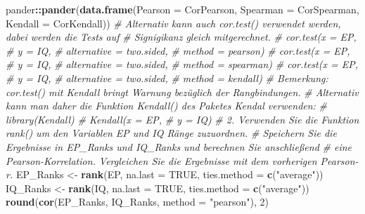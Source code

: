 \documentclass[
]{article}
\newenvironment{Shaded}{\begin{snugshade}}{\end{snugshade}}
\newcommand{\AttributeTok}[1]{\textcolor[rgb]{0.13,0.29,0.53}{#1}}
\newcommand{\CommentTok}[1]{\textcolor[rgb]{0.56,0.35,0.01}{\textit{#1}}}
\newcommand{\ConstantTok}[1]{\textcolor[rgb]{0.56,0.35,0.01}{#1}}
\newcommand{\DecValTok}[1]{\textcolor[rgb]{0.00,0.00,0.81}{#1}}
\newcommand{\FunctionTok}[1]{\textcolor[rgb]{0.13,0.29,0.53}{\textbf{#1}}}
\newcommand{\NormalTok}[1]{#1}
\newcommand{\OtherTok}[1]{\textcolor[rgb]{0.56,0.35,0.01}{#1}}
\newcommand{\SpecialCharTok}[1]{\textcolor[rgb]{0.81,0.36,0.00}{\textbf{#1}}}
\newcommand{\StringTok}[1]{\textcolor[rgb]{0.31,0.60,0.02}{#1}}
\begin{document}
\begin{Shaded}
\begin{Highlighting}[]
\NormalTok{    pander}\SpecialCharTok{::}\FunctionTok{pander}\NormalTok{(}\FunctionTok{data.frame}\NormalTok{(}\AttributeTok{Pearson  =}\NormalTok{ CorPearson,}
                      \AttributeTok{Spearman =}\NormalTok{ CorSpearman,}
                      \AttributeTok{Kendall  =}\NormalTok{ CorKendall))}
    \CommentTok{\# Alternativ kann auch cor.test() verwendet werden, dabei werden die Tests auf}
    \CommentTok{\# Signigikanz gleich mitgerechnet.}
    \CommentTok{\# cor.test(x = EP, }
    \CommentTok{\#          y = IQ, }
    \CommentTok{\#          alternative = \textquotesingle{}two.sided\textquotesingle{}, }
    \CommentTok{\#          method = \textquotesingle{}pearson\textquotesingle{})    }
    \CommentTok{\# cor.test(x = EP, }
    \CommentTok{\#          y = IQ, }
    \CommentTok{\#          alternative = \textquotesingle{}two.sided\textquotesingle{}, }
    \CommentTok{\#          method = \textquotesingle{}spearman\textquotesingle{})    }
    \CommentTok{\# cor.test(x = EP, }
    \CommentTok{\#          y = IQ, }
    \CommentTok{\#          alternative = \textquotesingle{}two.sided\textquotesingle{}, }
    \CommentTok{\#          method = \textquotesingle{}kendall\textquotesingle{})    }
    \CommentTok{\# Bemerkung: cor.test() mit Kendall bringt Warnung bezüglich der Rangbindungen.}
    \CommentTok{\#            Alternativ kann man daher die Funktion Kendall() des Paketes Kendal verwenden:}
      \CommentTok{\# library(Kendall)}
        \CommentTok{\# Kendall(x = EP, }
        \CommentTok{\#         y = IQ)}
    \CommentTok{\# 2. Verwenden Sie die Funktion rank() um den Variablen EP und IQ Ränge zuzuordnen.}
    \CommentTok{\#   Speichern Sie die Ergebnisse in EP\_Ranks und IQ\_Ranks und berechnen Sie anschließend}
    \CommentTok{\#   eine Pearson{-}Korrelation. Vergleichen Sie die Ergebnisse mit dem vorherigen Pearson{-}r.}
\NormalTok{    EP\_Ranks }\OtherTok{\textless{}{-}} \FunctionTok{rank}\NormalTok{(EP, }\AttributeTok{na.last =} \ConstantTok{TRUE}\NormalTok{,}
                     \AttributeTok{ties.method =} \FunctionTok{c}\NormalTok{(}\StringTok{"average"}\NormalTok{))}
\NormalTok{    IQ\_Ranks }\OtherTok{\textless{}{-}} \FunctionTok{rank}\NormalTok{(IQ, }\AttributeTok{na.last =} \ConstantTok{TRUE}\NormalTok{,}
                     \AttributeTok{ties.method =} \FunctionTok{c}\NormalTok{(}\StringTok{"average"}\NormalTok{))}
    \FunctionTok{round}\NormalTok{(}\FunctionTok{cor}\NormalTok{(EP\_Ranks, IQ\_Ranks, }\AttributeTok{method =} \StringTok{"pearson"}\NormalTok{), }\DecValTok{2}\NormalTok{)}
\end{Highlighting}
\end{Shaded}
\end{document}
